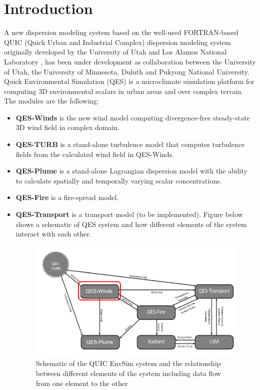 \section{Introduction}

A new dispersion modeling system based on the well-used FORTRAN-based QUIC (Quick Urban and Industrial Complex) dispersion modeling system originally developed by the University of Utah and Los Alamos National Laboratory \cite{brown2013quic}, has been under development as collaboration between the University of Utah, the University of Minnesota, Duluth and Pukyong National University. Quick Environmental Simulation (QES) is a microclimate simulation platform for computing 3D environmental scalars in urban areas and over complex terrain.
The modules are the following:
\begin{itemize}

\item \textbf{QES-Winds} is the new wind model computing divergence-free steady-state 3D wind field in complex domain.
\item \textbf{QES-TURB} is a stand-alone turbulence model that computes turbulence fields from the calculated wind field in QES-Winds.
\item \textbf{QES-Plume} is a stand-alone Lagrangian dispersion model with the ability to calculate spatially and temporally varying scalar concentrations.
\item \textbf{QES-Fire} is a fire-spread model.
\item \textbf{QES-Transport} is a transport model (to be implemented).
Figure below shows a schematic of QES system and how different elements of the system interact with each other.

\begin{figure}[h!]
\includegraphics[width=16cm]{Images/QES_chart.png}
\centering
\caption{Schematic of the QUIC EnvSim system and the relationship between different elements of the system including data flow from one element to the other}
\end{figure}


\end{itemize}
